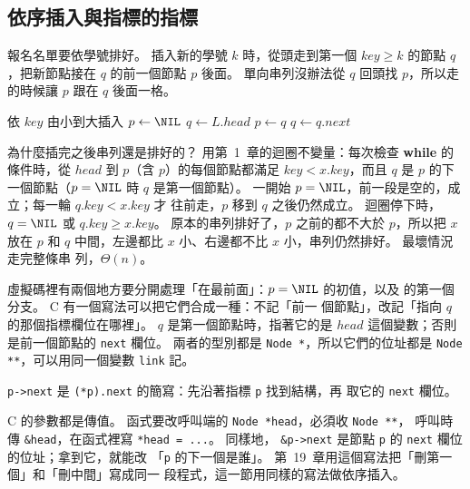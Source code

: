 \subsection{依序插入與指標的指標}

報名名單要依學號排好。 插入新的學號 $k$ 時，從頭走到第一個 $\mathit{key} \ge k$
的節點 $q$，把新節點接在 $q$ 的前一個節點 $p$ 後面。 單向串列沒辦法從 $q$ 回頭找
$p$，所以走的時候讓 $p$ 跟在 $q$ 後面一格。

\begin{pseudo}[label=alg:ll-sorted-insert]{依 $\mathit{key}$ 由小到大插入}
    \State $p \gets \NIL$ 
    \State $q \gets L.\mathit{head}$
        \State $p \gets q$
        \State $q \gets q.\mathit{next}$
    \EndWhile
    \State {}
\EndProcedure
\end{pseudo}

為什麼插完之後串列還是排好的？ 用第~1~章的迴圈不變量：每次檢查 \textbf{while} 的
條件時，從 $\mathit{head}$ 到 $p$（含 $p$）的每個節點都滿足 $\mathit{key} <
x.\mathit{key}$，而且 $q$ 是 $p$ 的下一個節點（$p = \NIL$ 時 $q$ 是第一個節點）。
一開始 $p = \NIL$，前一段是空的，成立；每一輪 $q.\mathit{key} < x.\mathit{key}$ 才
往前走，$p$ 移到 $q$ 之後仍然成立。 迴圈停下時，$q = \NIL$ 或 $q.\mathit{key} \ge
x.\mathit{key}$。 原本的串列排好了，$p$ 之前的都不大於 $p$，所以把 $x$ 放在 $p$ 和
$q$ 中間，左邊都比 $x$ 小、右邊都不比 $x$ 小，串列仍然排好。 最壞情況走完整條串
列，$\Theta(n)$。

虛擬碼裡有兩個地方要分開處理「在最前面」：$p = \NIL$ 的初值，以及
 的第一個分支。 C 有一個寫法可以把它們合成一種：不記「前一
個節點」，改記「指向 $q$ 的那個指標欄位在哪裡」。 $q$ 是第一個節點時，指著它的是
$\mathit{head}$ 這個變數；否則是前一個節點的 \texttt{next} 欄位。 兩者的型別都是
\texttt{Node *}，所以它們的位址都是 \texttt{Node **}，可以用同一個變數
\texttt{link} 記。

\begin{cbookrecap}[第~14~章 14.5 節、第~19~章 19.9、19.10 節]
\texttt{p->next} 是 \texttt{(*p).next} 的簡寫：先沿著指標 \texttt{p} 找到結構，再
取它的 \texttt{next} 欄位。

C 的參數都是傳值。 函式要改呼叫端的 \texttt{Node *head}，必須收 \texttt{Node **}，
呼叫時傳 \texttt{\&head}，在函式裡寫 \texttt{*head = ...}。 同樣地，
\texttt{\&p->next} 是節點 \texttt{p} 的 \texttt{next} 欄位的位址；拿到它，就能改
「\texttt{p} 的下一個是誰」。 第~19~章用這個寫法把「刪第一個」和「刪中間」寫成同一
段程式，這一節用同樣的寫法做依序插入。
\end{cbookrecap}

